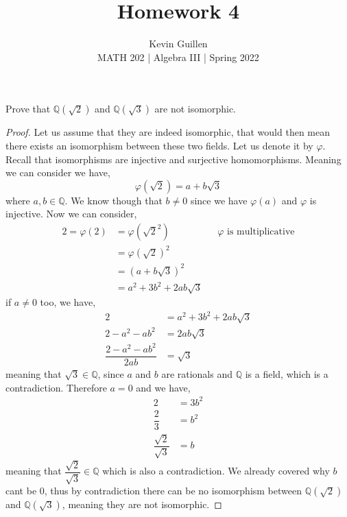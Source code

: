 \documentclass[11pt]{article}
\newenvironment{problem}[2][Problem\!]{\begin{tcolorbox}\begin{trivlist}
\item[\hskip \labelsep {\bfseries #1}\hskip \labelsep {\bfseries #2}]}{\end{trivlist}\end{tcolorbox}}
\newcommand{\qq}{\mathbb Q}   %
\renewcommand{\phi}{\varphi}
\begin{document}
 
\title{Homework 4}
\author{Kevin Guillen\\[0.5em]
MATH 202 | Algebra III | Spring 2022}
\date{} 
\maketitle



  \begin{problem} {14.1.5}
    Prove that $\qq(\sqrt{2})$ and $\qq(\sqrt{3})$ are not isomorphic.
  \end{problem}

\begin{proof}
    Let us assume that they are indeed isomorphic, that would then mean there exists an isomorphism between these two fields. Let us denote it by $\phi$. Recall that isomorphisms are injective and surjective homomorphisms. Meaning we can consider we have,
    \[\phi(\sqrt{2}) = a + b\sqrt{3}\]
    where $a,b\in \qq$. We know though that $b\neq 0$ since we have $\phi(a)$ and $\phi$ is injective.
    Now we can consider, 
    \begin{align*}
      2 = \phi(2) &= \phi(\sqrt{2}^{2})  && \phi \text{ is multiplicative} \\
      &= \phi(\sqrt{2})^{2} \\
      &= (a+b\sqrt{3})^{2} \\
      &= a^{2} + 3b^{2} + 2ab\sqrt{3}
    \end{align*}
    if $a\neq 0$ too, we have,
    \begin{align*}
      2 &= a^{2} + 3b^{2} + 2ab\sqrt{3} \\
      2 - a^{2} -ab^{2} &= 2ab\sqrt{3} \\
      \dfrac{2 - a^{2} -ab^{2}}{2ab} &= \sqrt{3}
    \end{align*}
    meaning that $\sqrt{3} \in \qq$, since $a$ and $b$ are rationals and $\qq$ is a field,  which is a contradiction. Therefore $a = 0$ and we have,
    \begin{align*}
      2 &= 3b^{2} \\
      \dfrac{2}{3} &= b^{2} \\
      \dfrac{\sqrt{2}}{\sqrt{3}} &= b
    \end{align*}
    meaning that $\dfrac{\sqrt{2}}{\sqrt{3}}\in \qq$ which is also a contradiction. We already covered why $b$ cant be 0, thus by contradiction there can be no isomorphism between $\qq(\sqrt{2})$ and $\qq(\sqrt{3})$, meaning they are not isomorphic. 
\end{proof}
\end{document}
